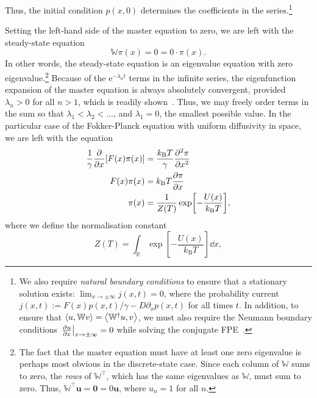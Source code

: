 \documentclass[hyperref={colorlinks=true, urlcolor=blue, citecolor=blue, final, bound}]{sfuthesis}
\newcommand{\kB}{k_{\mathrm{B}}}
\newcommand{\e}{\mathrm{e}}
\begin{document}
Thus, the initial condition $p(x,0)$ determines the coefficients in the series.\footnote{We also require \textit{natural boundary conditions} to ensure that a stationary solution exists: $\lim_{x\rightarrow\pm\infty} j(x,t) = 0$, where the probability current $j(x, t) := F(x)p(x,t)/\gamma-D\partial_x p(x,t)$ for all times $t$. In addition, to ensure that $\ev{u, \mathbb W v} = \ev{\mathbb W^\dagger u, v}$, we must also require the Neumann boundary conditions $\eval{\pdv{u}{x}}_{x\rightarrow\pm\infty}=0$ while solving the conjugate FPE~\cite{Risken1996}.} 

Setting the left-hand side of the master equation to zero, we are left with the steady-state equation
\begin{equation}
    \mathbb W \pi(x) = 0 = 0\cdot \pi(x).
\end{equation}
In other words, the steady-state equation is an eigenvalue equation with zero eigenvalue.\footnote{The fact that the master equation must have at least one zero eigenvalue is perhaps most obvious in the discrete-state case. Since each column of $\mathbb W$ sums to zero, the \textit{rows} of $\mathbb W^\intercal$, which has the same eigenvalues as $\mathbb W$, must sum to zero. Thus, $\mathbb W^\intercal \mathbf u= \mathbf 0 = 0\mathbf u$, where $u_n = 1$ for all $n$. } Because of the $\e^{-\lambda_n t}$ terms in the infinite series, the eigenfunction expansion of the master equation is always absolutely convergent, provided $\lambda_n>0$ for all $n>1$, which is readily shown~\cite[Ch.~5]{Risken1996}. Thus, we may freely order terms in the sum so that $\lambda_1 < \lambda_2 < \dots$, and $\lambda_1=0$, the smallest possible value. In the particular case of the Fokker-Planck equation with uniform diffusivity in space, we are left with the equation 
\begin{align}
    \frac 1{\gamma}\pdv{x}[F(x)\pi(x)] &= \frac{\kB T}{\gamma}\pdv[2]{\pi}{x}\label{eq:boltzmannderiv1}\\
    F(x)\pi(x) &= \kB T\pdv{\pi}{x} \label{eq:boltzmannderiv2}\\
    \pi(x) &= \frac 1{Z(T)} \exp[-\frac{U(x)}{\kB T}]\label{eq:boltzmannDistro},
\end{align}
where we define the normalisation constant
\begin{equation}
    Z(T) = \int_{\mathbb R} \exp[-\frac{U(x)}{\kB T}]\dd{x},
\end{equation}
\end{document}
